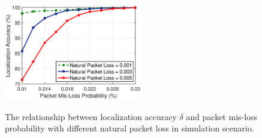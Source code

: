 \begin{figure}%
  \centering
  \includegraphics[width=6cm]{code_matlab/localizationaccuracy.eps}\\
  \caption{The relationship between localization accuracy $\delta$ and packet mis-loss probability with different natural packet loss in simulation scenario.}\label{localizationaccuracyfig1}
\end{figure}
\fi
